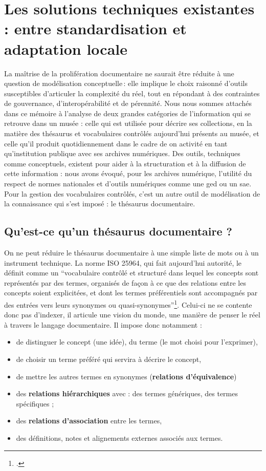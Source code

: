 \section{\label{III-A-2}Les solutions techniques existantes : entre standardisation et adaptation locale}


La maîtrise de la prolifération documentaire ne saurait être réduite à une question de modélisation conceptuelle : elle implique le choix raisonné d’outils susceptibles d’articuler la complexité du réel, tout en répondant à des contraintes de gouvernance, d’interopérabilité et de pérennité. Nous nous sommes attachés dans ce mémoire à l'analyse de deux grandes catégories de l'information qui se retrouve dans un musée : celle qui est utilisée pour décrire ses collections, en la matière des thésaurus et vocabulaires contrôlés aujourd'hui présents au musée, et celle qu'il produit quotidiennement dans le cadre de on activité en tant qu'institution publique avec ses archives numériques. Des outils, techniques comme conceptuels, existent pour aider à la structuration et à la diffusion de cette information : nous avons évoqué, pour les archives numérique, l'utilité du respect de normes nationales et d'outils numériques comme une \gls{ged} ou un \ac{sae}. Pour la gestion des vocabulaires contrôlés, c'est un autre outil de modélisation de la connaissance qui s'est imposé : le thésaurus documentaire.



\subsection{Qu’est-ce qu’un thésaurus documentaire ?}

On ne peut réduire le thésaurus documentaire à une simple liste de mots ou à un instrument technique. La norme ISO 25964, qui fait aujourd’hui autorité, le définit comme un \enquote{vocabulaire contrôlé et structuré dans lequel les concepts sont représentés par des termes, organisés de façon à ce que des relations entre les concepts soient explicitées, et dont les termes préférentiels sont accompagnés par des entrées vers leurs synonymes ou quasi-synonymes}\footcite{ISO25964120112011,maroyeISO25964Distinction2015}. Celui-ci ne se contente donc pas d’indexer, il articule une vision du monde, une manière de penser le réel à travers le langage documentaire. Il impose donc notamment :
\begin{itemize}
	\item de distinguer le concept (une idée), du terme (le mot choisi pour l'exprimer),
	\item de choisir un terme préféré qui servira à décrire le concept,
	\item de mettre les autres termes en synonymes (\textbf{relations d'équivalence})
	\item des \textbf{relations hiérarchiques} avec :
		\subitem des termes génériques,
		\subitem des termes spécifiques ;
	\item des \textbf{relations d'association} entre les termes,
	\item des définitions, notes et alignements externes associés aux termes.
\end{itemize}

